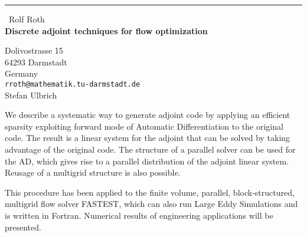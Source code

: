 \documentclass{report}
\begin{document}
\begin{center}
\rule{6in}{1pt} \
{\large Rolf Roth \\
{\bf Discrete adjoint techniques for flow optimization}}

Dolivostrasse 15 \\ 64293 Darmstadt \\ Germany
\\
{\tt rroth@mathematik.tu-darmstadt.de}\\
Stefan Ulbrich\end{center}

We describe a systematic way to generate adjoint code by applying an
efficient sparsity exploiting forward mode of Automatic Differentiation
to the original code. The result is a linear system for the adjoint that
can be solved by taking advantage of the original code.
The structure of a parallel solver can be used for the AD, which gives
rise to a parallel distribution of the adjoint linear system. Reusage of
a multigrid structure is also possible.

This procedure has been applied to the finite volume, parallel,
block-structured, multigrid flow solver FASTEST, which can also run Large
Eddy Simulations and is written in Fortran. Numerical results of
engineering applications will be presented.
\end{document}
